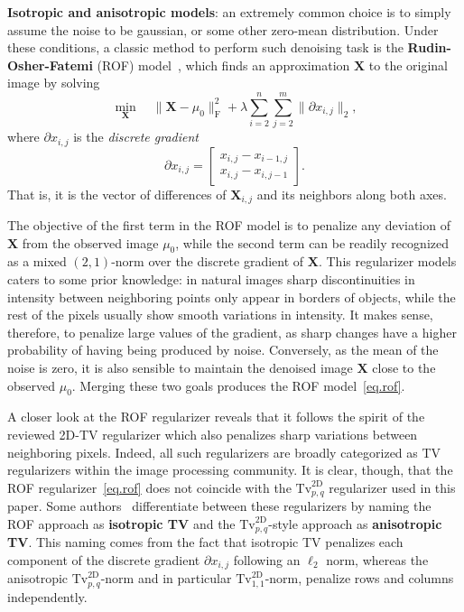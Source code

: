 \documentclass[twoside,11pt]{article}
\newcommand{\mx}{\bm{X}}
\newcommand{\mynorm}[2]{\| {#1} \|_{#2}}
\newcommand{\enorm}[1]{\mynorm{#1}{2}}
\newcommand{\frob}[1]{\|{#1}\|_{\text{F}}}
\newcommand{\tvell}{\text{Tv}}
\newcommand{\twod}{\text{2D}}
\numberwithin{equation}{section}
\numberwithin{theorem}{section}
\begin{document}
\textbf{Isotropic and anisotropic models}: an extremely common choice is to simply assume the noise to be gaussian, or some other zero-mean distribution. Under these conditions, a classic method to perform such denoising task is the {\bf Rudin-Osher-Fatemi} (ROF) model~\citep{RudinTV92}, which finds an approximation $\mx$ to the original image by solving
\begin{equation}
  \label{eq.rof}
 \min_{\mx} \quad \frob{\mx - \mu_0}^2 + \lambda \sum_{i=2}^{n} \sum_{j=2}^{m} \enorm{\partial x_{i,j}} ,
\end{equation}
where $\partial x_{i,j}$ is the \emph{discrete gradient}
\begin{equation*}
 \partial x_{i,j} = \left[ \begin{array}{c} x_{i,j} - x_{i-1,j} \\ x_{i,j} - x_{i,j-1} \end{array} \right].
\end{equation*}
That is, it is the vector of differences of $\mx_{i,j}$ and its neighbors along both axes.

The objective of the first term in the ROF model is to penalize any deviation of $\mx$ from the observed image $\mu_0$, while the second term can be readily recognized as a mixed $(2,1)$-norm over the discrete gradient of $\mx$. This regularizer models caters to some prior knowledge: in natural images sharp discontinuities in intensity between neighboring points only appear in borders of objects, while the rest of the pixels usually show smooth variations in intensity. It makes sense, therefore, to penalize large values of the gradient, as sharp changes have a higher probability of having being produced by noise. Conversely, as the mean of the noise is zero, it is also sensible to maintain the denoised image $\mx$ close to the observed $\mu_0$. Merging these two goals produces the ROF model~\eqref{eq.rof}.

A closer look at the ROF regularizer reveals that it follows the spirit of the reviewed 2D-TV regularizer which also penalizes sharp variations between neighboring pixels. Indeed, all such regularizers are broadly categorized as TV regularizers within the image processing community. It is clear, though, that the ROF regularizer~\eqref{eq.rof} does not coincide with the $\tvell_{p,q}^{\twod}$ regularizer used in this paper. Some authors~\citep{TwIST} differentiate between these regularizers by naming the ROF approach as {\bf isotropic TV} and the $\tvell_{p,q}^{\twod}$-style approach as {\bf anisotropic TV}. This naming comes from the fact that isotropic TV penalizes each component of the discrete gradient $\partial x_{i,j}$ following an $\ell_2$ norm, whereas the anisotropic $\tvell_{p,q}^{\twod}$-norm  and in particular $\tvell_{1,1}^{\twod}$-norm, penalize rows and columns independently.
\end{document}
